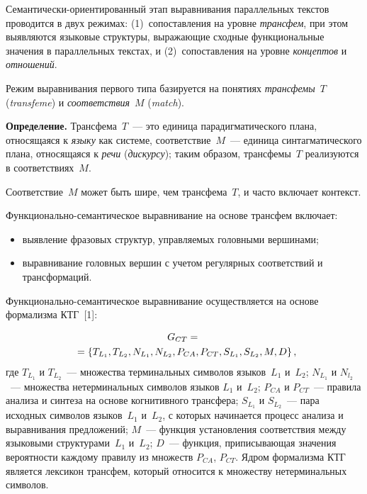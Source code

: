 \begin{multicols}{2}
   Семантически-ориентированный этап выравнивания параллельных текстов
проводится в двух режимах: (1)~сопоставления на уровне \textit{трансфем}, при
этом выявляются языковые структуры, выражающие сходные функциональные
значения в параллельных текстах, и (2)~сопоставления на уровне
\textit{концептов} и \textit{отношений}.

   Режим выравнивания первого типа базируется на понятиях
\textit{трансфемы}~$T$ (\textit{transfeme}) и \textit{соответствия}~$M$
(\textit{match}).

   \medskip

   \noindent
   \textbf{Определение.} Трансфема~$T$~--- это единица парадигматического
плана, относящаяся к \textit{языку} как системе, соответствие~$M$~--- единица
синтагматического плана, относящаяся к \textit{речи} (\textit{дискурсу}); таким
образом, трансфемы~$T$ реализуются в соответствиях~$M$.

   \smallskip

   Соответствие~$M$ может быть шире, чем трансфема~$T$, и часто включает
контекст.

   Функционально-семантическое выравнивание на основе трансфем включает:
   \begin{itemize}
     \item выявление фразовых структур, управляемых головными вершинами;\\[-15pt]
     \item выравнивание головных вершин с учетом регулярных соответствий и
трансформаций.
     \end{itemize}
   Функционально-семантическое выравнивание осуществляется на основе
формализма КТГ~[1]:

\noindent
   \begin{multline*}
   G_{CT}={}\\
   {}=\left\{ T_{L_1}, T_{L_2}, N_{L_1},
N_{L_2},P_{CA}, P_{CT}, S_{L_1},S_{L_2}, M, D\right\},\hspace*{-2.78597pt}
   \end{multline*}
где $T_{L_1}$ и $T_{L_2}$~--- множества терминальных символов языков~$L_1$
и~$L_2$; $N_{L_1}$ и $N_{l_2}$~--- множества нетерминальных символов языков
$L_1$ и~$L_2$; $P_{CA}$ и $P_{CT}$~--- правила анализа и синтеза на основе
когнитивного трансфера; $S_{L_1}$ и $S_{L_2}$~--- пара исходных символов
языков~$L_1$ и~$L_2$, с которых начинается процесс анализа и выравнивания
предложений; $M$~--- функция установления соответствия между языковыми
структурами~$L_1$ и~$L_2$; $D$~--- функция, приписывающая значения
вероятности каждому правилу из множеств $P_{CA}$, $P_{CT}$. Ядром
формализма КТГ является лексикон трансфем, который относится к множеству
нетерминальных символов.


\end{multicols}
